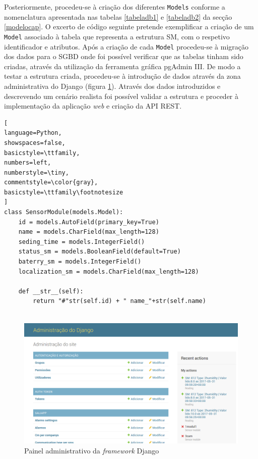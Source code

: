 Posteriormente, procedeu-se à criação dos diferentes \texttt{Models} conforme a nomenclatura apresentada nas tabelas \ref{tabeladb1} e \ref{tabeladb2} da secção \ref{modelocap}. O excerto de código seguinte pretende exemplificar a criação de um \texttt{Model} associado à tabela que representa a estrutura \acl{SM}, com o respetivo identificador e atributos.  Após a criação de cada \texttt{Model} procedeu-se à migração dos dados para o \ac{SGBD} onde foi possível verificar que as tabelas tinham sido criadas, através da utilização da ferramenta gráfica pgAdmin III. De modo a testar a estrutura criada, procedeu-se à introdução de dados através da zona administrativa do Django (figura \ref{admingdjango}). Através dos dados introduzidos e descrevendo um cenário realista foi possível validar a estrutura e proceder à implementação da aplicação \textit{web} e criação da \ac{API} \ac{REST}. 




\begin{lstlisting}[
language=Python,
showspaces=false,
basicstyle=\ttfamily,
numbers=left,
numberstyle=\tiny,
commentstyle=\color{gray},
basicstyle=\ttfamily\footnotesize
]
class SensorModule(models.Model):
	id = models.AutoField(primary_key=True)
	name = models.CharField(max_length=128)
	seding_time = models.IntegerField()
	status_sm = models.BooleanField(default=True)
	baterry_sm = models.IntegerField()
	localization_sm = models.CharField(max_length=128)
		
	def __str__(self):
		return "#"str(self.id) + " name_"+str(self.name)


\end{lstlisting}


\begin{figure}[!htb]
	\centering
	\includegraphics[scale=0.4]{prints-web/admindjango.png}
	\caption{Painel administrativo da \textit{framework} Django }
	\label{admingdjango}
\end{figure}








